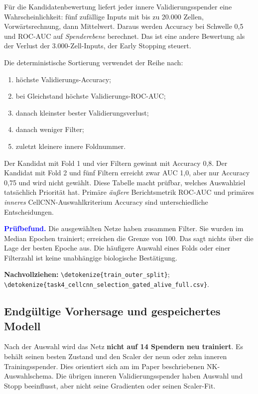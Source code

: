 \documentclass[11pt,a4paper]{article}
\newcommand{\code}[1]{\expandafter\nolinkurl\expandafter{\detokenize{#1}}}
\newcommand{\source}[1]{\par{\footnotesize\raggedright\color{muted}\textbf{Nachvollziehen:} #1\par}}
\newcommand{\finding}[1]{\par\smallskip\noindent\textcolor{blue}{\textbf{Prüfbefund.}} #1\par}
\newcommand{\tab}[4]{\begin{table}[!ht]\centering\caption{#2}\label{#3}{\small}#4\end{table}}
\begin{document}
Für die Kandidatenbewertung liefert jeder innere Validierungsspender eine
Wahrscheinlichkeit: fünf zufällige Inputs mit bis zu 20.000 Zellen,
Vorwärtsrechnung, dann Mittelwert. Daraus werden Accuracy bei Schwelle 0,5
und ROC-AUC auf \emph{Spenderebene} berechnet. Das ist eine andere Bewertung
als der Verlust der 3.000-Zell-Inputs, der Early Stopping steuert.

Die deterministische Sortierung verwendet der Reihe nach:
\begin{enumerate}
\item höchste Validierungs-Accuracy;
\item bei Gleichstand höchste Validierungs-ROC-AUC;
\item danach kleinster bester Validierungsverlust;
\item danach weniger Filter;
\item zuletzt kleinere innere Foldnummer.
\end{enumerate}
\tab{cellcnn_split0}{Tatsächliche neun Kandidaten für äußeren Split 0.
Accuracy und AUC beziehen sich auf vier bzw. fünf Validierungsspender.
„Epochen“ ist die Zahl durchlaufener Epochen, nicht die beste Epoche.}{tab:cnnbeispiel}{}

Der Kandidat mit Fold 1 und vier Filtern gewinnt mit Accuracy 0,8. Der
Kandidat mit Fold 2 und fünf Filtern erreicht zwar AUC 1,0, aber nur
Accuracy 0,75 und wird nicht gewählt. Diese Tabelle macht prüfbar,
welches Auswahlziel tatsächlich Priorität hat. Primäre \emph{äußere}
Berichtsmetrik ROC-AUC und primäres \emph{inneres} CellCNN-Auswahlkriterium
Accuracy sind unterschiedliche Entscheidungen.

\tab{cellcnn_auswahl}{Verteilung der 100 ausgewählten Netze nach Filterzahl
und innerem Fold. Quelle: alle 900 Kandidatenzeilen, Auswahlflag und
Sortierschlüssel unabhängig abgeglichen.}{tab:cnnauswahl}{}

\finding{Die ausgewählten Netze haben zusammen \CellcnnFilters{} Filter.
Sie wurden im Median \CnnEpochMedian{} Epochen trainiert; \CnnMaxEpochs{}
erreichen die Grenze von 100. Das sagt nichts über die Lage der besten
Epoche aus. Die häufigere Auswahl eines Folds oder einer Filterzahl ist
keine unabhängige biologische Bestätigung.}
\source{\code{train_outer_split}; \code{task4_cellcnn_selection_gated_alive_full.csv}.}

\clearpage
\subsection*{Endgültige Vorhersage und gespeichertes Modell}
Nach der Auswahl wird das Netz \textbf{nicht auf 14 Spendern neu trainiert}.
Es behält seinen besten Zustand und den Scaler der neun oder zehn inneren
Trainingsspender. Dies orientiert sich am im Paper beschriebenen NK-
Auswahlschema. Die übrigen inneren Validierungsspender haben Auswahl und
Stopp beeinflusst, aber nicht seine Gradienten oder seinen Scaler-Fit.
\end{document}
